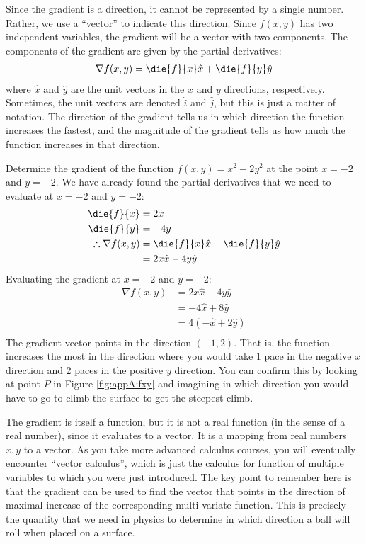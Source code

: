 Since the gradient is a direction, it cannot be represented by a single number. Rather, we use a ``vector'' to indicate this direction. Since $f(x,y)$ has two independent variables, the gradient will be a vector with two components. The components of the gradient are given by the partial derivatives:
\begin{align*}
\nabla f(x,y) = \die{f}{x}\hat x+\die{f}{y} \hat y
\end{align*}
where $\hat x$ and $\hat y$ are the unit vectors in the $x$ and $y$ directions, respectively. Sometimes, the unit vectors are denoted $\hat i$ and $\hat j$, but this is just a matter of notation. The direction of the gradient tells us in which direction the function increases the fastest, and the magnitude of the gradient tells us how much the function increases in that direction.

\begin{example}{Determine the gradient of the function $f(x,y)=x^2-2y^2$ at the point $x=-2$ and $y=-2$.}
We have already found the partial derivatives that we need to evaluate at $x=-2$ and $y=-2$:
\begin{align*}
\die{f}{x}&= 2x\\
\die{f}{y}&= -4y \\
\therefore \nabla f(x,y) &= \die{f}{x}\hat x+\die{f}{y} \hat y \\
&=2x\hat x-4y\hat y
\end{align*}
Evaluating the gradient at $x=-2$ and $y=-2$:
\begin{align*}
\nabla f(x,y) &= 2x\hat x-4y\hat y\\
&=-4 \hat x + 8 \hat y\\
&=4 (-\hat x+2\hat y)\\
\end{align*}
The gradient vector points in the direction $(-1,2)$. That is, the function increases the most in the direction where you would take 1 pace in the negative $x$ direction and 2 paces in the positive $y$ direction. You can confirm this by looking at point $P$ in Figure \ref{fig:appA:fxy} and imagining in which direction you would have to go to climb the surface to get the steepest climb.
\end{example}

The gradient is itself a function, but it is not a real function (in the sense of a real number), since it evaluates to a vector. It is a mapping from real numbers $x,y$ to a vector. As you take more advanced calculus courses, you will eventually encounter ``vector calculus'', which is just the calculus for function of multiple variables to which you were just introduced. The key point to remember here is that the gradient can be used to find the vector that points in the direction of maximal increase of the corresponding multi-variate function. This is precisely the quantity that we need in physics to determine in which direction a ball will roll when placed on a surface.


